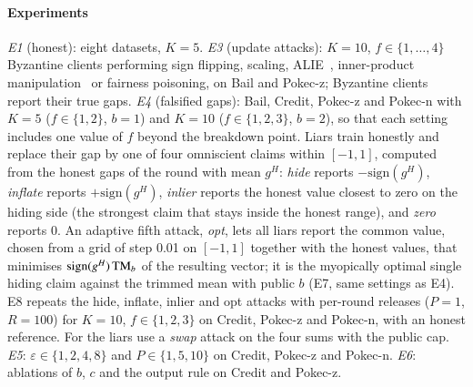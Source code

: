 \paragraph{Experiments}
\emph{E1} (honest): eight datasets, $K=5$. \emph{E3} (update attacks): $K=10$, $f\in\{1,\dots,4\}$ Byzantine clients performing sign flipping, scaling, ALIE~\citep{baruch2019little}, inner-product manipulation~\citep{xie2019fall} or fairness poisoning, on Bail and Pokec-z; Byzantine clients report their true gaps. \emph{E4} (falsified gaps): Bail, Credit, Pokec-z and Pokec-n with $K=5$ ($f\in\{1,2\}$, $b=1$) and $K=10$ ($f\in\{1,2,3\}$, $b=2$), so that each setting includes one value of $f$ beyond the breakdown point. Liars train honestly and replace their gap by one of four omniscient claims within $[-1,1]$, computed from the honest gaps of the round with mean $g^H$: \emph{hide} reports $-\mathrm{sign}(g^H)$, \emph{inflate} reports $+\mathrm{sign}(g^H)$, \emph{inlier} reports the honest value closest to zero on the hiding side (the strongest claim that stays inside the honest range), and \emph{zero} reports $0$. An adaptive fifth attack, \emph{opt}, lets all liars report the common value, chosen from a grid of step 0.01 on $[-1,1]$ together with the honest values, that minimises $\mathrm{sign}(g^H)\,\mathrm{TM}_b$ of the resulting vector; it is the myopically optimal single hiding claim against the trimmed mean with public $b$ (E7, same settings as E4). E8 repeats the hide, inflate, inlier and opt attacks with per-round releases ($P=1$, $R=100$) for $K=10$, $f\in\{1,2,3\}$ on Credit, Pokec-z and Pokec-n, with an honest reference. For \clamp{} the liars use a \emph{swap} attack on the four sums with the public cap. \emph{E5}: $\varepsilon\in\{1,2,4,8\}$ and $P\in\{1,5,10\}$ on Credit, Pokec-z and Pokec-n. \emph{E6}: ablations of $b$, $c$ and the output rule on Credit and Pokec-z.
